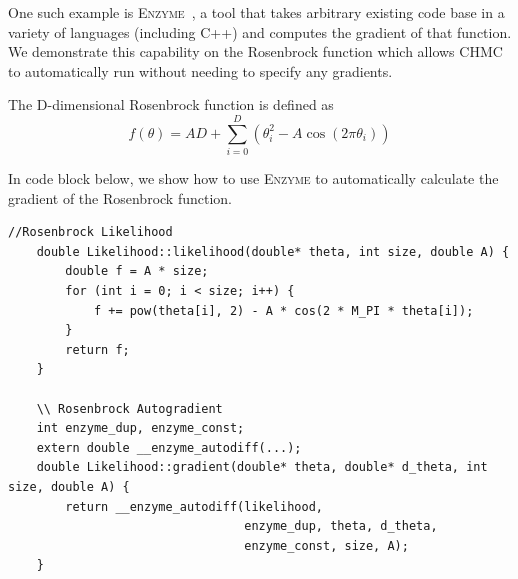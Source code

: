 \documentclass[11pt]{article}
\begin{document}
    One such example is \textsc{Enzyme}~\cite{NEURIPS2020_9332c513, 10.1145/3458817.3476165, 10.5555/3571885.3571964},
    a tool that takes arbitrary existing code base in a variety of languages (including C++) and computes the
    gradient of that function.
    We demonstrate this capability on the Rosenbrock function which allows CHMC to automatically run without needing to
    specify any gradients.

    The D-dimensional Rosenbrock function is defined as
    \begin{equation}\label{eq:rosenbrock}
        f(\theta) = AD + \sum_{i=0}^D\left(\theta_i^2 - A \cos (2 \pi \theta_i) \right)
    \end{equation}

    In code block below, we show how to use \textsc{Enzyme} to automatically calculate the gradient
    of the Rosenbrock function.

    \begin{widetext}
    \begin{lstlisting}[label={lst:enzyme}]
    //Rosenbrock Likelihood
    double Likelihood::likelihood(double* theta, int size, double A) {
        double f = A * size;
        for (int i = 0; i < size; i++) {
            f += pow(theta[i], 2) - A * cos(2 * M_PI * theta[i]);
        }
        return f;
    }

    \\ Rosenbrock Autogradient
    int enzyme_dup, enzyme_const;
    extern double __enzyme_autodiff(...);
    double Likelihood::gradient(double* theta, double* d_theta, int size, double A) {
        return __enzyme_autodiff(likelihood,
                                 enzyme_dup, theta, d_theta,
                                 enzyme_const, size, A);
    }
    \end{lstlisting}
    \end{widetext}
\end{document}
